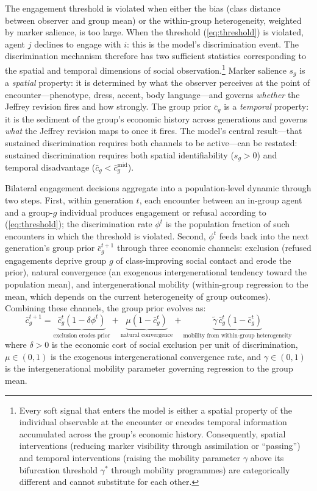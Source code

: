 \documentclass[12pt,a4paper]{article}
\theoremstyle{definition}
\numberwithin{proposition}{subsection}
\begin{document}
The engagement threshold is violated when either the bias (class
distance between observer and group mean) or the within-group
heterogeneity, weighted by marker salience, is too
large. When the threshold (\ref{eq:threshold}) is violated, agent
$j$ declines to engage with $i$: this is the model's discrimination
event. The discrimination mechanism therefore has two sufficient
statistics corresponding to the spatial and temporal dimensions of
social observation.\footnote{\label{rem:spacetime}Every soft signal
that enters the model is either a spatial property of the individual
observable at the encounter or encodes temporal information
accumulated across the group's economic history. Consequently,
spatial interventions (reducing marker visibility through assimilation
or ``passing'') and temporal interventions (raising the mobility
parameter $\gamma$ above its bifurcation threshold
$\gamma^*$ through mobility programmes) are categorically different
and cannot substitute for each other.} Marker salience $s_g$ is a
\emph{spatial} property: it is determined by what the observer
perceives at the point of encounter---phenotype, dress, accent, body
language---and governs \emph{whether} the Jeffrey revision fires and
how strongly. The group prior $\bar{c}_g$ is a \emph{temporal}
property: it is the sediment of the group's economic history across
generations and governs \emph{what} the Jeffrey revision maps to
once it fires. The model's central result---that sustained
discrimination requires both channels to be active---can be restated:
sustained discrimination requires both spatial identifiability
($s_g > 0$) and temporal disadvantage ($\bar{c}_g <
\bar{c}_g^{\mathrm{mid}}$).

Bilateral engagement decisions aggregate into a population-level
dynamic through two steps. First, within generation $t$, each
encounter between an in-group agent and a group-$g$ individual
produces engagement or refusal according to (\ref{eq:threshold});
the discrimination rate $\phi^t$ is the population fraction of
such encounters in which the threshold is violated. Second,
$\phi^t$ feeds back into the next generation's group prior
$\bar{c}_g^{t+1}$ through three economic channels: exclusion
(refused engagements deprive group $g$ of class-improving social
contact and erode the prior), natural convergence (an exogenous
intergenerational tendency toward the population mean), and
intergenerational mobility (within-group regression to the mean,
which depends on the current heterogeneity of group outcomes).
Combining these channels, the group prior evolves as:
\begin{equation}
  \bar{c}_g^{t+1} =
  \underbrace{\bar{c}_g^t(1 - \delta \phi^t)}_{\text{exclusion erodes prior}}
  + \underbrace{\mu(1 - \bar{c}_g^t)}_{\text{natural convergence}}
  + \underbrace{\tilde{\gamma}\,\bar{c}_g^t(1-\bar{c}_g^t)}_{\text{mobility from within-group heterogeneity}}
  \label{eq:dynamic}
\end{equation}
where $\delta > 0$ is the economic cost of social exclusion per unit
of discrimination, $\mu \in (0,1)$ is the exogenous intergenerational
convergence rate, and $\gamma \in (0,1)$ is the intergenerational
mobility parameter governing regression to the group mean.
\end{document}
